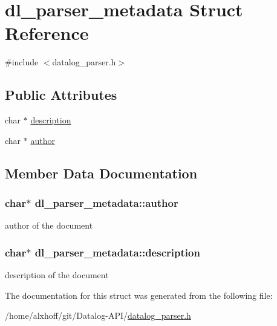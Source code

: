 \hypertarget{structdl__parser__metadata}{}\section{dl\+\_\+parser\+\_\+metadata Struct Reference}
\label{structdl__parser__metadata}


{\ttfamily \#include $<$datalog\+\_\+parser.\+h$>$}

\subsection*{Public Attributes}
\begin{DoxyCompactItemize}
\item 
char $\ast$ \hyperlink{structdl__parser__metadata_ab77a099560bf8f708cb7d0d84a90e3f0}{description}
\item 
char $\ast$ \hyperlink{structdl__parser__metadata_ae65dba395d288088c23042c14893235e}{author}
\end{DoxyCompactItemize}


\subsection{Member Data Documentation}
\subsubsection[{\texorpdfstring{author}{author}}]{\setlength{\rightskip}{0pt plus 5cm}char$\ast$ dl\+\_\+parser\+\_\+metadata\+::author}\hypertarget{structdl__parser__metadata_ae65dba395d288088c23042c14893235e}{}\label{structdl__parser__metadata_ae65dba395d288088c23042c14893235e}
author of the document 
\subsubsection[{\texorpdfstring{description}{description}}]{\setlength{\rightskip}{0pt plus 5cm}char$\ast$ dl\+\_\+parser\+\_\+metadata\+::description}\hypertarget{structdl__parser__metadata_ab77a099560bf8f708cb7d0d84a90e3f0}{}\label{structdl__parser__metadata_ab77a099560bf8f708cb7d0d84a90e3f0}
description of the document 

The documentation for this struct was generated from the following file\+:\begin{DoxyCompactItemize}
\item 
/home/alxhoff/git/\+Datalog-\/\+A\+P\+I/\hyperlink{datalog__parser_8h}{datalog\+\_\+parser.\+h}\end{DoxyCompactItemize}
